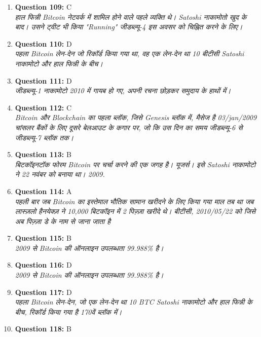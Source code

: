 \documentclass[12pt,a4paper]{article}
\begin{document}
\begin{enumerate}
\item \textbf{Question 109:} C
\\ \textit{हाल फिन्नी Bitcoin नेटवर्क में शामिल होने वाले पहले व्यक्ति थे। Satoshi नाकामोतो खुद के बाद। उसने ट्वीट भी किया "Running" जीडब्ल्यू-4 इस अवसर को चिह्नित करने के लिए।}

\item \textbf{Question 110:} D
\\ \textit{पहला Bitcoin लेन-देन जो रिकॉर्ड किया गया था, वह एक लेन-देन था 10 बीटीसी Satoshi नाकामोटो और हाल फिन्नी के बीच।}

\item \textbf{Question 111:} D
\\ \textit{जीडब्ल्यू-1 नाकामोटो 2010 में गायब हो गए, अपनी रचना छोड़कर समुदाय के हाथों में।}

\item \textbf{Question 112:} C
\\ \textit{Bitcoin और Blockchain का पहला ब्लॉक, जिसे Genesis ब्लॉक में, मैसेज है 03/jan/2009 चांसलर बैंकों के लिए दूसरे बेलआउट के कगार पर, जो कि उस दिन का समय जीडब्ल्यू-6 से जीडब्ल्यू-7 ब्लॉक तक।}

\item \textbf{Question 113:} B
\\ \textit{बिटकॉइनटॉक फोरम Bitcoin पर चर्चा करने की एक जगह है। यूजर्स। इसे Satoshi नाकामोटो ने 22 नवंबर को बनाया था। 2009.}

\item \textbf{Question 114:} A
\\ \textit{पहली बार जब Bitcoin का इस्तेमाल भौतिक सामान खरीदने के लिए किया गया माल तब था जब लास्ज़लो हैनयेक्ज़ ने 10,000 बिटकॉइन में 2 पिज़्ज़ा खरीदे थे। बीटीसी, 2010/05/22 को जिसे अब पिज़्ज़ा डे के नाम से जाना जाता है}

\item \textbf{Question 115:} B
\\ \textit{2009 से Bitcoin की ऑनलाइन उपलब्धता 99.988\% है।}

\item \textbf{Question 116:} D
\\ \textit{2009 से Bitcoin की ऑनलाइन उपलब्धता 99.988\% है।}

\item \textbf{Question 117:} D
\\ \textit{पहला Bitcoin लेन-देन, जो एक लेन-देन था 10 BTC Satoshi नाकामोटो और हाल फिन्नी के बीच, रिकॉर्ड किया गया है 170वें ब्लॉक में।}

\item \textbf{Question 118:} B


\end{enumerate}
\end{document}
